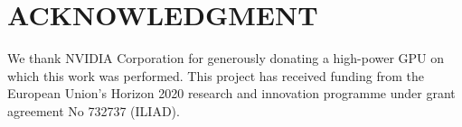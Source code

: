 \documentclass[letterpaper, 10 pt, conference]{ieeeconf}  %
\begin{document}





\section*{ACKNOWLEDGMENT}
We thank NVIDIA Corporation for generously donating a high-power GPU on which this work was performed. This project has received funding from the European Union's Horizon 2020 research and innovation programme under grant agreement No 732737 (ILIAD).


{
}

\end{document}
